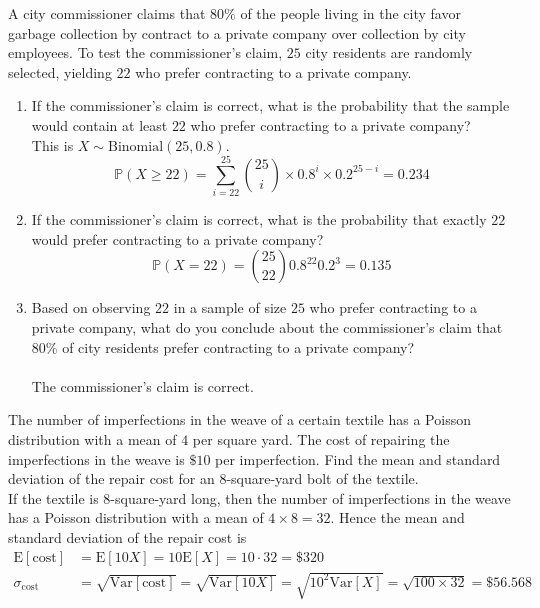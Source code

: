 \documentclass[12pt]{article}
\newcommand{\ques}[1]{\noindent {\bf Question #1: }}
\newcommand{\prob}[1]{\mathbb{P}(#1)}
\begin{document}
\newpage
\ques{3.184} A city commissioner claims that $80\%$ of the people living in the city favor garbage collection by contract to a private company over collection by city employees. To test the commissioner's claim, $25$ city residents are randomly selected, yielding $22$ who prefer contracting to a private company. 
\begin{enumerate} 
\item If the commissioner's claim is correct, what is the probability that the sample would contain at least $22$ who prefer contracting to a private company? 
\\ This is $X \sim \text{Binomial}(25, 0.8)$. $$ \prob{X \geq 22} = \sum_{i=22}^{25} \binom{25}{i} \times 0.8^i \times 0.2^{25 - i} = 0.234  $$ 
\item If the commissioner's claim is correct, what is the probability that exactly $22$ would prefer contracting to a private company? \\
$$ \prob{X = 22} = \binom{25}{22}0.8^{22}0.2^3 = 0.135 $$ 
\item Based on observing $22$ in a sample of size $25$ who prefer contracting to a private company, what do you conclude about the commissioner's claim that $80\%$ of city residents prefer contracting to a private company? \\~\\
The commissioner's claim is correct.
\\
\end{enumerate}


\ques{3.196} The number of imperfections in the weave of a certain textile has a Poisson distribution with a mean of $4$ per square yard. The cost of repairing the imperfections in the weave is $\$10$ per imperfection. Find the mean and standard deviation of the repair cost for an $8$-square-yard bolt of the textile. \\
If the textile is $8$-square-yard long, then the number of imperfections in the weave has a Poisson distribution with a mean of $4 \times 8 = 32$. Hence the mean and standard deviation of the repair cost is $$ \begin{aligned} 
\mathrm{E}[\text{cost}] &= \mathrm{E}[10X] = 10\mathrm{E}[X] = 10 \cdot 32 = \$320 \\
\sigma_{\text{cost}} &= \sqrt{\mathrm{Var}[\text{cost}]} = \sqrt{\mathrm{Var}[10X]} = \sqrt{10^2 \mathrm{Var}[X]} = \sqrt{100 \times 32} = \$56.568 \end{aligned} $$ 
\end{document}
